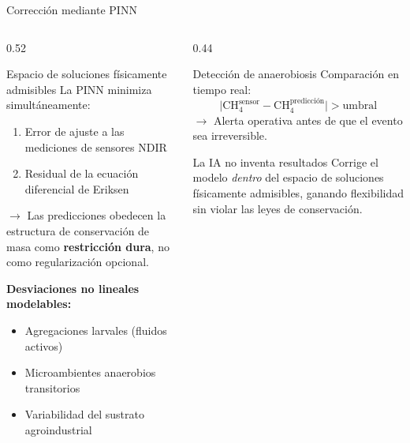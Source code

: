 \documentclass[aspectratio=169, 11pt]{beamer}
\begin{document}
\begin{frame}{Corrección mediante PINN}
\begin{columns}[T]
\begin{column}{0.52\textwidth}
\begin{block}{Espacio de soluciones físicamente admisibles}
La PINN minimiza simultáneamente:
\begin{enumerate}
    \item Error de ajuste a las mediciones de sensores NDIR
    \item Residual de la ecuación diferencial de Eriksen
\end{enumerate}
$\rightarrow$ Las predicciones obedecen la estructura de conservación de masa como \textbf{restricción dura}, no como regularización opcional.
\end{block}

\vspace{0.2cm}
\textbf{Desviaciones no lineales modelables:}
\begin{itemize}
    \item Agregaciones larvales (fluidos activos)
    \item Microambientes anaerobios transitorios
    \item Variabilidad del sustrato agroindustrial
\end{itemize}
\end{column}
\begin{column}{0.44\textwidth}
\begin{exampleblock}{Detección de anaerobiosis}
Comparación en tiempo real:
\begin{equation*}
\lvert \text{CH}_4^{\text{sensor}} - \text{CH}_4^{\text{predicci\'{o}n}} \rvert > \text{umbral}
\end{equation*}
$\rightarrow$ Alerta operativa antes de que el evento sea irreversible.
\end{exampleblock}

\vspace{0.2cm}
\begin{alertblock}{La IA no inventa resultados}
Corrige el modelo \textit{dentro} del espacio de soluciones físicamente admisibles, ganando flexibilidad sin violar las leyes de conservación.
\end{alertblock}
\end{column}
\end{columns}
\end{frame}
\end{document}

